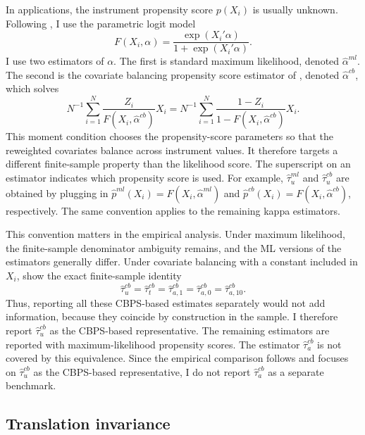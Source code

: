 \documentclass{article}
\begin{document}
In applications, the instrument propensity score $p(X_i)$ is usually unknown.
Following \citet{sloczynski2025abadie}, I use the parametric logit model
\[
F(X_i,\alpha)=\frac{\exp(X_i'\alpha)}{1+\exp(X_i'\alpha)}.
\]
I use two estimators of $\alpha$. The first is standard maximum likelihood,
denoted $\hat\alpha^{ml}$. The second is the covariate balancing propensity
score estimator of \citet{imai2014covariate}, denoted $\hat\alpha^{cb}$, which
solves
\begin{equation}
    N^{-1}\sum_{i=1}^N \frac{Z_i}{F(X_i,\hat\alpha^{cb})}X_i =
    N^{-1}\sum_{i=1}^N \frac{1-Z_i}{1-F(X_i,\hat\alpha^{cb})}X_i.
    \label{eq:cbps_moment}
\end{equation}
This moment condition chooses the propensity-score parameters so that the
reweighted covariates balance across instrument values. It therefore targets a
different finite-sample property than the likelihood score.
The superscript on an estimator indicates which propensity score is used. For example,
$\hat\tau_u^{ml}$ and $\hat\tau_u^{cb}$ are obtained by plugging in
$\hat p^{ml}(X_i)=F(X_i,\hat\alpha^{ml})$ and
$\hat p^{cb}(X_i)=F(X_i,\hat\alpha^{cb})$, respectively. The same convention applies
to the remaining kappa estimators.

This convention matters in the empirical analysis. Under maximum likelihood, the
finite-sample denominator ambiguity remains, and the ML versions of the
estimators generally differ. Under covariate balancing with a constant included
in $X_i$, \citet{sloczynski2025abadie} show the exact finite-sample identity
\[
\hat\tau_u^{cb}
=
\hat\tau_t^{cb}
=
\hat\tau_{a,1}^{cb}
=
\hat\tau_{a,0}^{cb}
=
\hat\tau_{a,10}^{cb}.
\]
Thus, reporting all these CBPS-based estimates separately would not add
information, because they coincide by construction in the sample. I therefore report
$\hat\tau_u^{cb}$ as the CBPS-based representative. The remaining estimators are
reported with maximum-likelihood propensity scores. The estimator \(\hat\tau_a^{cb}\) is not covered by this equivalence. Since the
empirical comparison follows \citet{sloczynski2025abadie} and focuses on
\(\hat\tau_u^{cb}\) as the CBPS-based representative, I do not report
\(\hat\tau_a^{cb}\) as a separate benchmark.







\subsection{Translation invariance}
\label{subsec:invariance_normalization}
\end{document}
